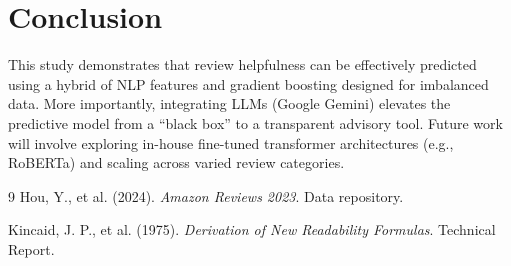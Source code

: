 \documentclass[11pt,a4paper,twoside]{article}
\begin{document}
\section{Conclusion}
This study demonstrates that review helpfulness can be effectively predicted using a hybrid of NLP features and gradient boosting designed for imbalanced data. More importantly, integrating LLMs (Google Gemini) elevates the predictive model from a ``black box'' to a transparent advisory tool. Future work will involve exploring in-house fine-tuned transformer architectures (e.g., RoBERTa) and scaling across varied review categories.

\begin{thebibliography}{9}
Hou, Y., et al. (2024). \textit{Amazon Reviews 2023}. Data repository.

Kincaid, J. P., et al. (1975). \textit{Derivation of New Readability Formulas}. Technical Report.
\end{thebibliography}
\end{document}
